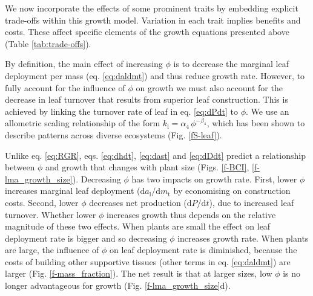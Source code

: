 \documentclass[12pt, a4paper]{article}
\begin{document}
We now incorporate the effects of some prominent traits by embedding
explicit trade-offs within this growth model. Variation in each trait
implies benefits and costs. These affect specific elements of the growth
equations presented above (Table \ref{tab:trade-offs}).

By definition, the main effect of increasing \(\phi\) is to decrease the
marginal leaf deployment per mass (eq. \ref{eq:daldmt}) and thus reduce
growth rate. However, to fully account for the influence of \(\phi\) on
growth we must also account for the decrease in leaf turnover that
results from superior leaf construction\citep{wright_world-2004}.
This is achieved by linking the turnover rate of leaf in eq.
\ref{eq:dPdt} to \(\phi\). We use an allometric scaling relationship of
the form \(k_\textrm{l}=\alpha_4 \, \phi^{-\beta_4}\), which has been
shown to describe patterns across diverse
ecosystems\citep{wright_world-2004} (Fig. \ref{fS-leaf}).

Unlike eq. \ref{eq:RGR}, eqs. \ref{eq:dhdt}, \ref{eq:dast} and
\ref{eq:dDdt} predict a relationship between \(\phi\) and growth that
changes with plant size (Figs. \ref{f-BCI}, \ref{f-lma_growth_size}).
Decreasing \(\phi\) has two impacts on growth rate. First, lower
\(\phi\) increases marginal leaf deployment
(\(\textrm{d}a_\textrm{l} / \textrm{d}m_\textrm{t}\) by economising on
construction costs. Second, lower \(\phi\) decreases net production
(\(\textrm{d}P / \textrm{d}t\)), due to increased leaf turnover. Whether
lower \(\phi\) increases growth thus depends on the relative magnitude
of these two effects. When plants are small the effect on leaf
deployment rate is bigger and so decreasing \(\phi\) increases growth
rate. When plants are large, the influence of \(\phi\) on leaf
deployment rate is diminished, because the costs of building other
supportive tissues (other terms in eq. \ref{eq:daldmt}) are larger (Fig.
\ref{f-mass_fraction}). The net result is that at larger sizes, low
\(\phi\) is no longer advantageous for growth (Fig.
\ref{f-lma_growth_size}d).
\end{document}
